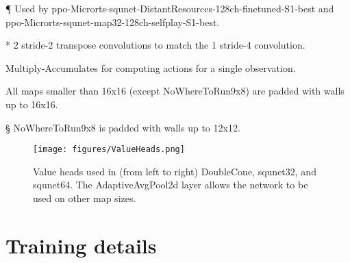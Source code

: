 \documentclass{article}
\begin{document}
\begin{table}[h]
\begin{threeparttable}
\begin{tablenotes}
            \item[\P] Used by ppo-Microrts-squnet-DistantResources-128ch-finetuned-S1-best and ppo-Microrts-squnet-map32-128ch-selfplay-S1-best. 
            \item[*] 2 stride-2 transpose convolutions to match the 1 stride-4 convolution.
            \item[\dag] Multiply-Accumulates for computing actions for a single observation.
            \item[\ddag] All maps smaller than 16x16 (except NoWhereToRun9x8) are padded with walls up to 16x16. 
            \item[\S] NoWhereToRun9x8 is padded with walls up to 12x12.
        \end{tablenotes}
    \end{threeparttable}
\end{table}

\begin{figure}[h]
    \begin{center}
        \texttt{[image: figures/ValueHeads.png]}
    \end{center}
    \caption{Value heads used in (from left to right) DoubleCone, squnet32, and
    squnet64. The AdaptiveAvgPool2d layer allows the network to be used on other map
    sizes.}
    \label{fig:valueheads}
\end{figure}

\section{Training details}
\end{document}
